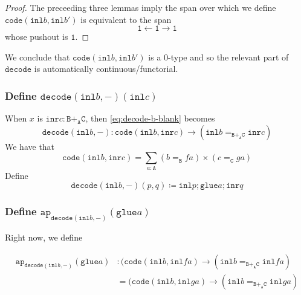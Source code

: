 \message{ !name(notes.tex)}\documentclass[12pt]{amsart}
\newcommand{\from}{\colon}
\newcommand{\type}[1]{\mathtt{#1}}
\newcommand{\tin}{\colon}
\newcommand{\A}{\type{A}}
\newcommand{\B}{\type{B}}
\newcommand{\C}{\type{C}}
\newcommand{\BAC}{\B +_{\A} \C}
\newcommand{\ap}{\type{ap}}
\newcommand{\inl}{\type{inl}}
\newcommand{\inr}{\type{inr}}
\newcommand{\glue}{\type{glue}}
\newcommand{\code}{\type{code}}
\newcommand{\decode}{\type{decode}}
\theoremstyle{remark}
\theoremstyle{definition}
\begin{document}
\begin{proof}
  The preceeding three lemmas imply the span over which we define \(
  \code ( \inl b , \inl b' ) \) is equivalent to the span
  \[
    \type{1} \gets \type{1} \to \type{1}
  \]
  whose pushout is \( \type{1} \).
\end{proof}

We conclude that \( \code ( \inl b , \inl b' ) \) is a 0-type and so
the relevant part of \( \decode \) is automatically continuous/functorial.

\subsubsection{Define \( \decode ( \inl b , - ) ( \inl c ) \)} %

When \( x \) is \( \inr c \tin \BAC \), then \eqref{eq:decode-b-blank} becomes
\[
  \decode ( \inl b , - )
  \from
  \code ( \inl b , \inr c )
  \to
  ( \inl b =_{\BAC} \inr c )
\]
We have that
\[
  \code ( \inl b , \inr c )
  =
  \sum\limits_{a \tin \A} (b =_{\B} fa) \times (c =_{\C} ga)
\]
Define
\[
  \decode ( \inl b , - ) ( p , q )
  \coloneqq
  \inl p ; \glue a ; \inr q
\]

\subsubsection{ Define \( \ap_{\decode ( \inl b , - )} (\glue a) \) } %

Right now, we define

\begin{align*}
  \ap_{\decode ( \inl b , - )} (\glue a) &
  \tin
  ( \code ( \inl b , \inl fa ) \to ( \inl b =_{\BAC} \inl fa ) \\
  & =
  ( \code ( \inl b , \inl ga ) \to ( \inl b =_{\BAC} \inl ga )
\end{align*}
\end{document}
